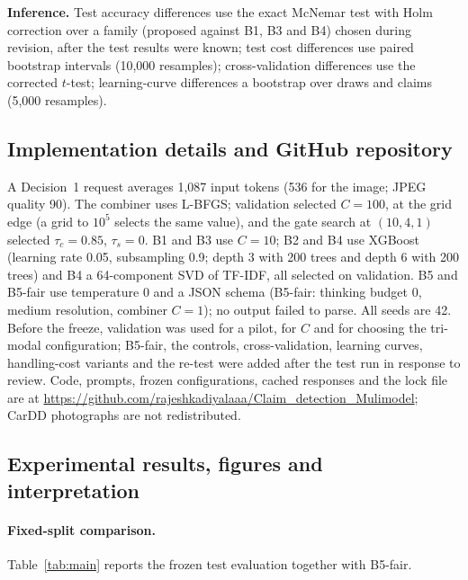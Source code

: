 \textbf{Inference.} Test accuracy differences use the exact McNemar test with Holm correction over a family (proposed against B1, B3 and B4) chosen during revision, after the test results were known; test cost differences use paired bootstrap intervals (10,000 resamples); cross-validation differences use the corrected $t$-test; learning-curve differences a bootstrap over draws and claims (5,000 resamples).

\subsection{Implementation details and GitHub repository}\label{sec:impl}

A Decision~1 request averages 1,087 input tokens (536 for the image; JPEG quality 90). The combiner uses L-BFGS; validation selected $C=100$, at the grid edge (a grid to $10^5$ selects the same value), and the gate search at $(10,4,1)$ selected $\tau_c=0.85$, $\tau_s=0$. B1 and B3 use $C=10$; B2 and B4 use XGBoost (learning rate 0.05, subsampling 0.9; depth 3 with 200 trees and depth 6 with 200 trees) and B4 a 64-component SVD of TF-IDF, all selected on validation. B5 and B5-fair use temperature 0 and a JSON schema (B5-fair: thinking budget 0, medium resolution, combiner $C=1$); no output failed to parse. All seeds are 42. Before the freeze, validation was used for a pilot, for $C$ and for choosing the tri-modal configuration; B5-fair, the controls, cross-validation, learning curves, handling-cost variants and the re-test were added after the test run in response to review. Code, prompts, frozen configurations, cached responses and the lock file are at \url{https://github.com/rajeshkadiyalaaa/Claim_detection_Mulimodel}; CarDD photographs are not redistributed.

\subsection{Experimental results, figures and interpretation}\label{sec:exp}

\paragraph{Fixed-split comparison.}
Table~\ref{tab:main} reports the frozen test evaluation together with B5-fair.


